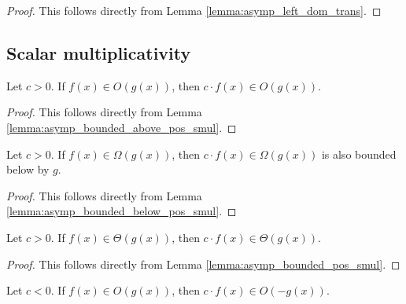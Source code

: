 \begin{proof}
    \leanok
    This follows directly from Lemma \ref{lemma:asymp_left_dom_trans}.
\end{proof}


\subsection{Scalar multiplicativity}

\begin{lemma}
    \label{lemma:big_o_pos_smul}
    \leanok
    Let $c > 0$. If $f(x) \in O(g(x))$, then $c \cdot f(x) \in O(g(x))$.
\end{lemma}

\begin{proof}
    \leanok
    This follows directly from Lemma \ref{lemma:asymp_bounded_above_pos_smul}.
\end{proof}

\begin{lemma}
    \label{lemma:big_omega_pos_smul}
    \leanok
    Let $c > 0$. If $f(x) \in \Omega(g(x))$, then $c \cdot f(x) \in \Omega(g(x))$ is also bounded
    below by $g$.
\end{lemma}

\begin{proof}
    \leanok
    This follows directly from Lemma \ref{lemma:asymp_bounded_below_pos_smul}.
\end{proof}

\begin{lemma}
    \label{lemma:theta_pos_smul}
    \leanok
    Let $c > 0$. If $f(x) \in \Theta(g(x))$, then $c \cdot f(x) \in \Theta(g(x))$.
\end{lemma}

\begin{proof}
    \leanok
    This follows directly from Lemma \ref{lemma:asymp_bounded_pos_smul}.
\end{proof}

\begin{lemma}
    \label{lemma:big_o_neg_smul}
    \leanok
    Let $c < 0$. If $f(x) \in O(g(x))$, then $c \cdot f(x) \in O(-g(x))$.
\end{lemma}

